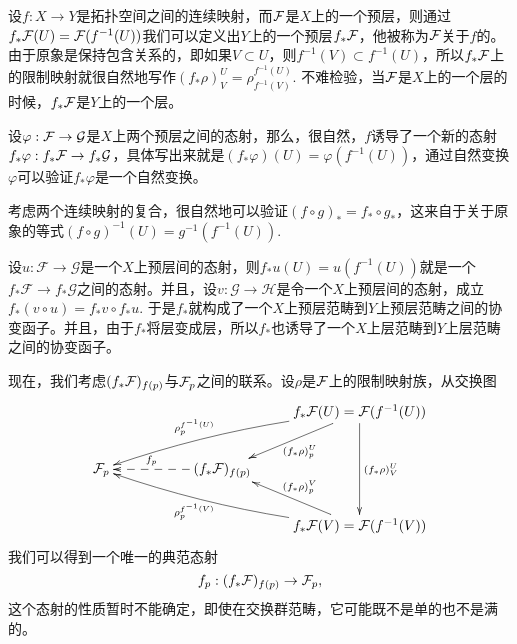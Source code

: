 \begin{para}[顺像]\label{sx}
设$f:X\to Y$是拓扑空间之间的连续映射，而$\mathcal{F}$是$X$上的一个预层，则通过$f_*\mathcal{F}(U)=\mathcal{F}(f^{-1}(U))$我们可以定义出$Y$上的一个预层$f_*\mathcal{F}$，他被称为$\mathcal{F}$关于$f$的。 由于原象是保持包含关系的，即如果$V\subset U$，则$f^{-1}(V)\subset f^{-1}(U)$，所以$f_*\mathcal{F}$上的限制映射就很自然地写作$(f_*\rho)^U_V=\rho^{f^{-1}(U)}_{f^{-1}(V)}$. 不难检验，当$\mathcal{F}$是$X$上的一个层的时候，$f_*\mathcal{F}$是$Y$上的一个层。

设$\varphi:\mathcal{F}\to\mathcal{G}$是$X$上两个预层之间的态射，那么，很自然，$f$诱导了一个新的态射$f_*\varphi:f_*\mathcal{F}\to f_*\mathcal{G}$，具体写出来就是$(f_*\varphi)(U)=\varphi(f^{-1}(U))$，通过自然变换$\varphi$可以验证$f_*\varphi$是一个自然变换。

考虑两个连续映射的复合，很自然地可以验证$(f\circ g)_*=f_*\circ g_*$，这来自于关于原象的等式$(f\circ g)^{-1}(U)=g^{-1}(f^{-1}(U))$. 

设$u:\mathcal{F}\to\mathcal{G}$是一个$X$上预层间的态射，则$f_*u(U)=u(f^{-1}(U))$就是一个$f_*\mathcal{F}\to f_*\mathcal{G}$之间的态射。并且，设$v:\mathcal{G}\to\mathcal{H}$是令一个$X$上预层间的态射，成立$f_*(v\circ u)=f_*v\circ f_* u$. 于是$f_*$就构成了一个$X$上预层范畴到$Y$上预层范畴之间的协变函子。并且，由于$f_*$将层变成层，所以$f_*$也诱导了一个$X$上层范畴到$Y$上层范畴之间的协变函子。
\end{para}



现在，我们考虑$(f_*\mathcal{F})_{f(p)}$与$\mathcal{F}_p$之间的联系。设$\rho$是$\mathcal{F}$上的限制映射族，从交换图
\[
	\xymatrix{
		&&&f_*\calf(U)=\calf(f^{-1}(U))\ar[dl]^{(f_*\rho)_{p}^U}\ar[dd]^{(f_*\rho)^U_{V}}\ar@/_/[llld]_-{\rho_{p}^{f^{-1}(U)}} \\
		\calf_p&&(f_*\calf)_{f(p)}\ar@{-->}[ll]_-{f_p}&\\
		&&&f_*\calf(V)=\calf(f^{-1}(V))\ar[ul]_{(f_*\rho)_{p}^V}\ar@/^/[lllu]^-{\rho_{p}^{f^{-1}(V)}}
	}
\]
我们可以得到一个唯一的典范态射
\[
f_p:(f_*\mathcal{F})_{f(p)}\to \mathcal{F}_p,
\]
这个态射的性质暂时不能确定，即使在交换群范畴，它可能既不是单的也不是满的。


